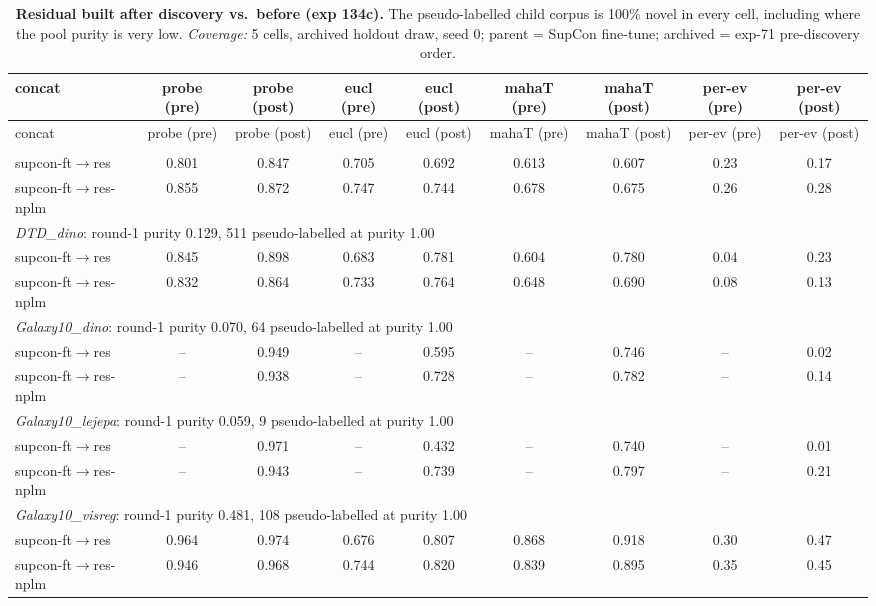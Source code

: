 \begin{landscape}
\begin{center}
\footnotesize
\setlength{\tabcolsep}{3pt}
\begin{longtable}{lcccccccc}
\caption{\textbf{Residual built after discovery vs.\ before (exp 134c).} The pseudo-labelled child corpus is 100\% novel in every cell, including where the pool purity is very low. \emph{Coverage:} 5 cells, archived holdout draw, seed 0; parent = SupCon fine-tune; archived = exp-71 pre-discovery order.}\label{tab:app_postdisc}\\
\toprule
concat & probe (pre) & probe (post) & eucl (pre) & eucl (post) & mahaT (pre) & mahaT (post) & per-ev (pre) & per-ev (post) \\
\midrule
\endfirsthead
\toprule
concat & probe (pre) & probe (post) & eucl (pre) & eucl (post) & mahaT (pre) & mahaT (post) & per-ev (pre) & per-ev (post) \\
\midrule
\endhead
\bottomrule
\endfoot
\multicolumn{9}{l}{\emph{cars\_visreg}: round-1 purity 0.206, 217 pseudo-labelled at purity 1.00} \\
\quad supcon-ft$\to$res & 0.801 & 0.847 & 0.705 & 0.692 & 0.613 & 0.607 & 0.23 & 0.17 \\
\quad supcon-ft$\to$res-nplm & 0.855 & 0.872 & 0.747 & 0.744 & 0.678 & 0.675 & 0.26 & 0.28 \\
\multicolumn{9}{l}{\emph{DTD\_dino}: round-1 purity 0.129, 511 pseudo-labelled at purity 1.00} \\
\quad supcon-ft$\to$res & 0.845 & 0.898 & 0.683 & 0.781 & 0.604 & 0.780 & 0.04 & 0.23 \\
\quad supcon-ft$\to$res-nplm & 0.832 & 0.864 & 0.733 & 0.764 & 0.648 & 0.690 & 0.08 & 0.13 \\
\multicolumn{9}{l}{\emph{Galaxy10\_dino}: round-1 purity 0.070, 64 pseudo-labelled at purity 1.00} \\
\quad supcon-ft$\to$res & -- & 0.949 & -- & 0.595 & -- & 0.746 & -- & 0.02 \\
\quad supcon-ft$\to$res-nplm & -- & 0.938 & -- & 0.728 & -- & 0.782 & -- & 0.14 \\
\multicolumn{9}{l}{\emph{Galaxy10\_lejepa}: round-1 purity 0.059, 9 pseudo-labelled at purity 1.00} \\
\quad supcon-ft$\to$res & -- & 0.971 & -- & 0.432 & -- & 0.740 & -- & 0.01 \\
\quad supcon-ft$\to$res-nplm & -- & 0.943 & -- & 0.739 & -- & 0.797 & -- & 0.21 \\
\multicolumn{9}{l}{\emph{Galaxy10\_visreg}: round-1 purity 0.481, 108 pseudo-labelled at purity 1.00} \\
\quad supcon-ft$\to$res & 0.964 & 0.974 & 0.676 & 0.807 & 0.868 & 0.918 & 0.30 & 0.47 \\
\quad supcon-ft$\to$res-nplm & 0.946 & 0.968 & 0.744 & 0.820 & 0.839 & 0.895 & 0.35 & 0.45 \\
\end{longtable}
\end{center}
\end{landscape}
